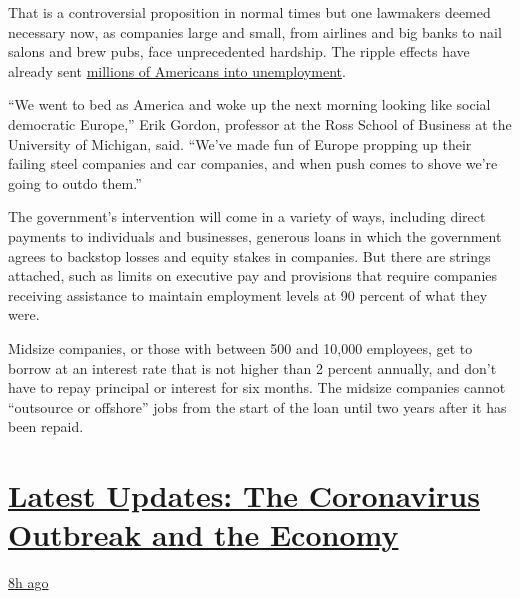 That is a controversial proposition in normal times but one lawmakers
deemed necessary now, as companies large and small, from airlines and
big banks to nail salons and brew pubs, face unprecedented hardship. The
ripple effects have already sent
\href{https://www.nytimes.com/2020/03/26/business/economy/coronavirus-unemployment-claims.html}{millions
of Americans into unemployment}.

``We went to bed as America and woke up the next morning looking like
social democratic Europe,'' Erik Gordon, professor at the Ross School of
Business at the University of Michigan, said. ``We've made fun of Europe
propping up their failing steel companies and car companies, and when
push comes to shove we're going to outdo them.''

The government's intervention will come in a variety of ways, including
direct payments to individuals and businesses, generous loans in which
the government agrees to backstop losses and equity stakes in companies.
But there are strings attached, such as limits on executive pay and
provisions that require companies receiving assistance to maintain
employment levels at 90 percent of what they were.

Midsize companies, or those with between 500 and 10,000 employees, get
to borrow at an interest rate that is not higher than 2 percent
annually, and don't have to repay principal or interest for six months.
The midsize companies cannot ``outsource or offshore'' jobs from the
start of the loan until two years after it has been repaid.

\hypertarget{latest-updates-the-coronavirus-outbreak-and-the-economy}{%
\section{\texorpdfstring{\href{https://www.nytimes.com/live/2020/08/17/business/stock-market-today-coronavirus?action=click\&pgtype=Article\&state=default\&region=MAIN_CONTENT_1\&context=storylines_live_updates}{Latest
Updates: The Coronavirus Outbreak and the
Economy}}{Latest Updates: The Coronavirus Outbreak and the Economy}}\label{latest-updates-the-coronavirus-outbreak-and-the-economy}}

\href{https://www.nytimes.com/live/2020/08/17/business/stock-market-today-coronavirus?action=click\&pgtype=Article\&state=default\&region=MAIN_CONTENT_1\&context=storylines_live_updates\#robinhood-a-stock-trading-app-is-valued-at-11-2-billion-in-its-latest-funding-round}{8h
ago}

